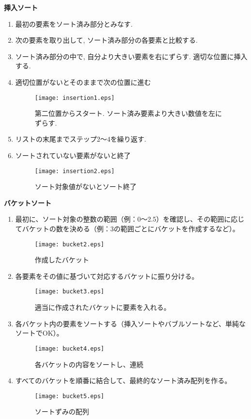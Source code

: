 \documentclass[a4j, 12pt]{jarticle}
\begin{document}
\newpage
\textbf{挿入ソート}
\begin{enumerate}
  \item 最初の要素をソート済み部分とみなす. 
  \item 次の要素を取り出して, ソート済み部分の各要素と比較する. 
  \item ソート済み部分の中で, 自分より大きい要素を右にずらす. 適切な位置に挿入する. 
  \item 適切位置がないとそのままで次の位置に進む
  \begin{figure}[H]
    \centering
    \texttt{[image: insertion1.eps]}
    \caption{第二位置からスタート. ソート済み要素より大きい数値を左にずらす.}
  \end{figure}
  \item リストの末尾までステップ2〜4を繰り返す. 
  \item ソートされていない要素がないと終了
  \begin{figure}[H]
    \centering
    \texttt{[image: insertion2.eps]}
    \caption{ソート対象値がないとソート終了}
  \end{figure}
\end{enumerate}
\textbf{バケットソート}
\begin{enumerate}
  \begin{figure}[H]
    \centering
    \texttt{[image: bucket1.eps]}
    \caption{ソート対象データ}
  \end{figure}
  \item 最初に、ソート対象の整数の範囲（例：0〜2.5）を確認し、その範囲に応じてバケットの数を決める（例：3の範囲ごとにバケットを作成するなど）。
  \begin{figure}[H]
    \centering
    \texttt{[image: bucket2.eps]}
    \caption{作成したバケット}
  \end{figure}
  \item 各要素をその値に基づいて対応するバケットに振り分ける。
  \begin{figure}[H]
    \centering
    \texttt{[image: bucket3.eps]}
    \caption{適当に作成されたバケットに要素を入れる。}
  \end{figure}
  \newpage
  \item 各バケット内の要素をソートする（挿入ソートやバブルソートなど、単純なソートでOK）。
  \begin{figure}[H]
    \centering
    \texttt{[image: bucket4.eps]}
    \caption{各バケットの内容をソートし、連続}
  \end{figure}
  \item すべてのバケットを順番に結合して、最終的なソート済み配列を作る。
  \begin{figure}[H]
    \centering
    \texttt{[image: bucket5.eps]}
    \caption{ソートずみの配列}
  \end{figure}
\end{enumerate}
\end{document}

